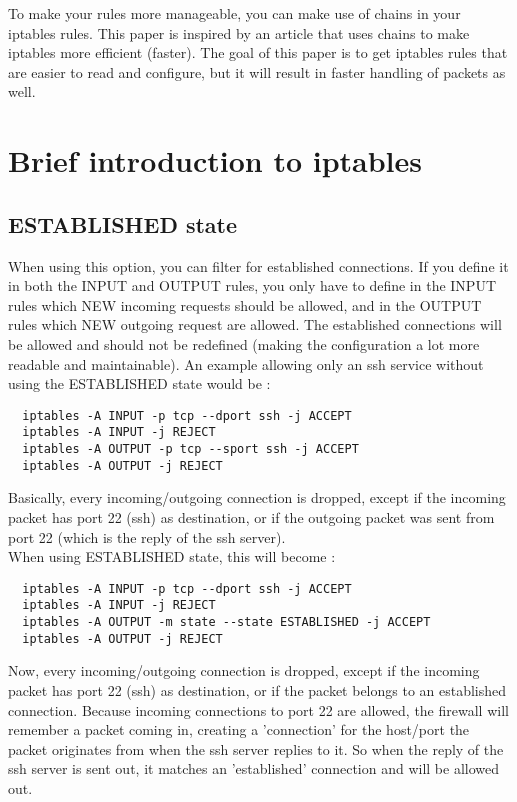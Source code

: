 \documentclass[a4paper,12pt]{article}
\begin{document}
To make your rules more manageable, you can make use of chains in your iptables rules. This paper is inspired by an article that uses chains to make iptables more efficient (faster). The goal of this paper is to get iptables rules that are easier to read and configure, but it will result in faster handling of packets as well.\\

\section{Brief introduction to iptables}
\subsection{ESTABLISHED state}
When using this option, you can filter for established connections. If you define it in both the INPUT and OUTPUT rules, you only have to define in the INPUT rules which NEW incoming requests should be allowed, and in the OUTPUT rules which NEW outgoing request are allowed. The established connections will be allowed and should not be redefined (making the configuration a lot more readable and maintainable). An example allowing only an ssh service without using the ESTABLISHED state would be :
\begin{verbatim}
  iptables -A INPUT -p tcp --dport ssh -j ACCEPT
  iptables -A INPUT -j REJECT
  iptables -A OUTPUT -p tcp --sport ssh -j ACCEPT
  iptables -A OUTPUT -j REJECT
\end{verbatim}

Basically, every incoming/outgoing connection is dropped, except if the incoming packet has port 22 (ssh) as destination, or if the outgoing packet was sent from port 22 (which is the reply of the ssh server).\\

When using ESTABLISHED state, this will become :
\begin{verbatim}
  iptables -A INPUT -p tcp --dport ssh -j ACCEPT
  iptables -A INPUT -j REJECT
  iptables -A OUTPUT -m state --state ESTABLISHED -j ACCEPT
  iptables -A OUTPUT -j REJECT
\end{verbatim}

Now, every incoming/outgoing connection is dropped, except if the incoming packet has port 22 (ssh) as destination, or if the packet belongs to an established connection. Because incoming connections to port 22 are allowed, the firewall will remember a packet coming in, creating a 'connection' for the host/port the packet originates from when the ssh server replies to it. So when the reply of the ssh server is sent out, it matches an 'established' connection and will be allowed out.\\
\end{document}
